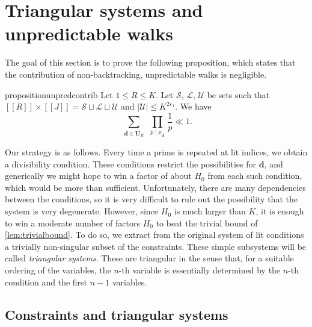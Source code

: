 \documentclass[11pt]{amsart}
\theoremstyle{definition}
\renewcommand{\leq}{\leqslant}
\newcommand{\sinterval}[1]{[\![#1]\!] }
\newcommand{\eps}{\varepsilon}
\renewcommand{\d}{\boldsymbol{d}}
\newcommand{\cstU}{2\eps_1}
\newcommand{\unpred}{\mathbf{U}_{\!\tupsize}}
\newcommand{\fprod}[1]{\rho_{#1}}
\newcommand{\pall}{\fprod{\d}}
\newcommand{\lit}{\mathcal{L}}
\newcommand{\unlit}{\mathcal{U}}
\newcommand{\s}{\mathcal{S}}
\newcommand{\repK}{K}
\newcommand{\newR}{\sinterval{J}}
\newcommand{\tupsize}{R}
\begin{document}

\section{Triangular systems and unpredictable walks}
\label{sec:unpredictable}

The goal of this section is to prove the following proposition, which states that the contribution of non-backtracking, unpredictable walks is negligible. 

\begin{restatable}{proposition}{unpredcontrib}
\label{lem:unpredictable}
Let $1\leq \tupsize\leq \repK$. Let $\s$, $\lit$, $\unlit$ be sets such that $\sinterval{\tupsize}\times \newR = \s\sqcup\lit\sqcup\unlit$ and $|\unlit| \leq\repK^{\cstU}$. We have
\begin{equation*}
 \sum_{\substack{\d\in \unpred}}\,\prod_{p\mid \pall}\, \frac{1}{p} \ll 1.
\end{equation*}
\end{restatable}

Our strategy is as follows. Every time a prime is repeated at lit indices, we obtain a divisibility condition. These conditions restrict the possibilities for $\d$, and generically we might hope to win a factor of about $H_0$ from each such condition, which would be more than sufficient. Unfortunately, there are many dependencies between the conditions, so it is very difficult to rule out the possibility that the system is very degenerate. However, since $H_0$ is much larger than $\repK$, it is enough to win a moderate number of factors $H_0$ to beat the trivial bound of \cref{lem:trivialbound}. To do so, we extract from the original system of lit conditions a trivially non-singular subset of the constraints. These simple subsystems will be called \emph{triangular systems}. These are triangular in the sense that, for a suitable ordering of the variables, the $n$-th variable is essentially determined by the $n$-th condition and the first $n-1$ variables.

\subsection{Constraints and triangular systems}
\end{document}

